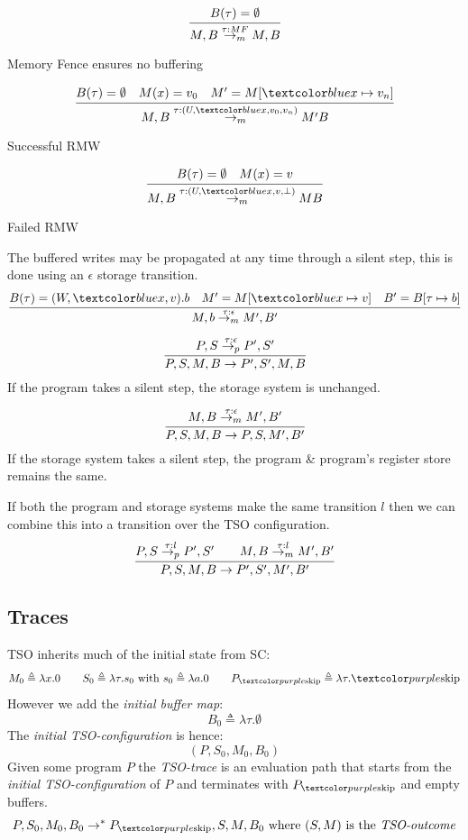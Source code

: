 \\ \begin{minipage}[b]{.33\textwidth}
    \[\cfrac{B(\tau) = \emptyset}{M,B \overset{\tau:MF}{\to_m}M, B}\]
    \centerline{Memory Fence ensures no buffering}
\end{minipage}
\begin{minipage}[b]{.33\textwidth}
    \[\cfrac{
        B(\tau) = \emptyset \quad M(x) = v_0 \quad M' = M[\wmem{x} \mapsto v_n]
    }{
        M, B \mtrans{\tau}{(U, \wmem{x}, v_0, v_n)} M' B
    }\]
    \centerline{Successful RMW}
\end{minipage}
\begin{minipage}[b]{.33\textwidth}
    \[\cfrac{
        B(\tau) = \emptyset \quad M(x) = v
    }{
        M, B \mtrans{\tau}{(U, \wmem{x}, v, \bot)} M B
    }\]
    \centerline{Failed RMW}
\end{minipage}
\vspace{5mm}
The buffered writes may be propagated at any time through a silent step, this is done using an $\epsilon$ storage transition.
\[\cfrac{
    B(\tau) = (W, \wmem{x}, v).b \quad M' = M[\wmem{x} \mapsto v] \quad B' = B[\tau \mapsto b]
}{
    M, b \mtrans{\tau}{\epsilon} M', B'
}\]

\begin{minipage}[b]{.48\textwidth}
    \[\cfrac{
    P, S \overset{\tau:\epsilon}{\to_p} P', S'
    }{
        P, S, M, B \to P', S', M, B
    }\]
    If the program takes a silent step, the storage system is unchanged.
\end{minipage}
\hfill
\vline
\hfill
\begin{minipage}[b]{.45\textwidth}
    \[\cfrac{
        M, B \overset{\tau:\epsilon}{\to_m} M', B'
    }{
        P, S, M, B \to P, S, M', B'
    }\]
    If the storage system takes a silent step, the program \& program's register store remains the same.
\end{minipage}
\vspace{5mm}
If both the program and storage systems make the same transition $l$ then we can combine this into a transition over the TSO configuration.
\[\cfrac{
    P, S \overset{\tau:l}{\to_p} P', S' \qquad M, B \overset{\tau:l}{\to_m} M', B'
}{
    P, S, M, B \to P', S', M', B'
}\]

\subsection{Traces}
TSO inherits much of the initial state from SC:
\[M_0 \triangleq \lambda x . 0 \qquad S_0 \triangleq \lambda \tau . s_0 \text{ with } s_0 \triangleq \lambda a . 0 \qquad P_{\wskip} \triangleq \lambda \tau. \wskip\]
However we add the \textit{initial buffer map}:
\[B_0 \triangleq \lambda \tau . \emptyset\]
The \textit{initial TSO-configuration} is hence:
\[(P, S_0, M_0, B_0)\]
Given some program $P$ the \textit{TSO-trace} is an evaluation path that starts from the \textit{initial TSO-configuration} of $P$ and terminates with $P_{\wskip}$ and empty buffers.
\[P, S_0, M_0, B_0 \to^* P_{\wskip}, S, M, B_0 \text{ where } (S, M) \text{ is the \textit{TSO-outcome}}\]

